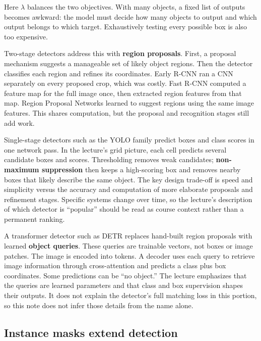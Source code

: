 Here \(\lambda\) balances the two objectives. With many objects, a fixed list of outputs becomes awkward: the model must decide how many objects to output and which output belongs to which target. Exhaustively testing every possible box is also too expensive.

Two-stage detectors address this with \textbf{region proposals}. First, a proposal mechanism suggests a manageable set of likely object regions. Then the detector classifies each region and refines its coordinates. Early R-CNN ran a CNN separately on every proposed crop, which was costly. Fast R-CNN computed a feature map for the full image once, then extracted region features from that map. Region Proposal Networks learned to suggest regions using the same image features. This shares computation, but the proposal and recognition stages still add work.

Single-stage detectors such as the YOLO family predict boxes and class scores in one network pass. In the lecture's grid picture, each cell predicts several candidate boxes and scores. Thresholding removes weak candidates; \textbf{non-maximum suppression} then keeps a high-scoring box and removes nearby boxes that likely describe the same object. The key design trade-off is speed and simplicity versus the accuracy and computation of more elaborate proposals and refinement stages. Specific systems change over time, so the lecture's description of which detector is ``popular'' should be read as course context rather than a permanent ranking.

A transformer detector such as DETR replaces hand-built region proposals with learned \textbf{object queries}. These queries are trainable vectors, not boxes or image patches. The image is encoded into tokens. A decoder uses each query to retrieve image information through cross-attention and predicts a class plus box coordinates. Some predictions can be ``no object.'' The lecture emphasizes that the queries are learned parameters and that class and box supervision shapes their outputs. It does not explain the detector's full matching loss in this portion, so this note does not infer those details from the name alone.

\subsection{Instance masks extend detection}\label{04-visual-computing-ii-ch031-instance-masks-extend-detection}

\hypertarget{04-visual-computing-ii-ch031-instance-masks-extend-detection}{}

